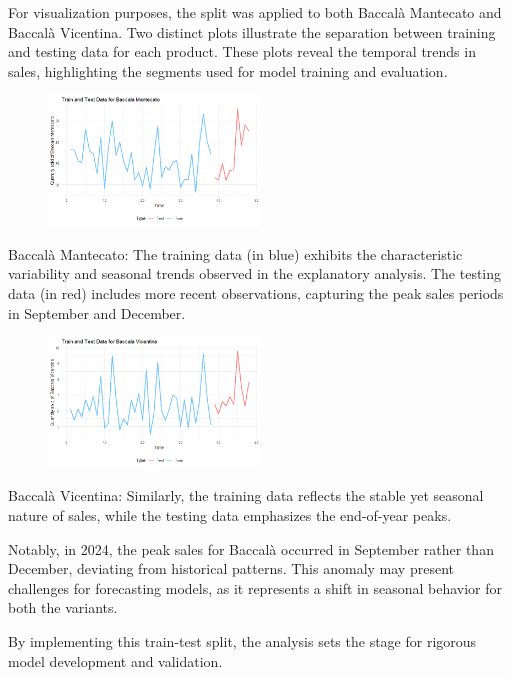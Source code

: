 \documentclass[10pt,twocolumn,letterpaper]{article}
\begin{document}
For visualization purposes, the split was applied to both Baccalà Mantecato and Baccalà Vicentina. Two distinct plots illustrate the separation between training and testing data for each product. These plots reveal the temporal trends in sales, highlighting the segments used for model training and evaluation.

\begin{figure}[H]
    \centering
    \includegraphics[width=0.5\textwidth]{PlotsBEFD/TRAIN_TEST_MAN.png} 
    \caption{}
    \label{fig:esempio}
\end{figure}
Baccalà Mantecato: The training data (in blue) exhibits the characteristic variability and seasonal trends observed in the explanatory analysis. The testing data (in red) includes more recent observations, capturing the peak sales periods in September and December.
\begin{figure}[H]
    \centering
    \includegraphics[width=0.5\textwidth]{PlotsBEFD/TRAIN_TEST_VIC.png} 
    \caption{}
    \label{fig:esempio}
\end{figure}
Baccalà Vicentina: Similarly, the training data reflects the stable yet seasonal nature of sales, while the testing data emphasizes the end-of-year peaks.

Notably, in 2024, the peak sales for Baccalà occurred in September rather than December, deviating from historical patterns. This anomaly may present challenges for forecasting models, as it represents a shift in seasonal behavior for both the variants.

By implementing this train-test split, the analysis sets the stage for rigorous model development and validation. 
\end{document}
